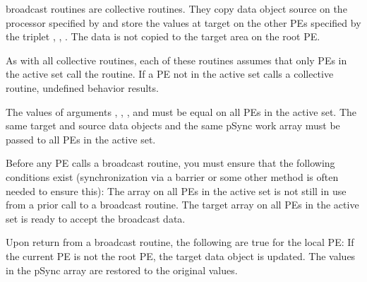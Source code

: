 {   
\openshmem broadcast routines are collective routines.
They copy data object source on the processor specified by  and
store the values at target on the other \ac{PE}s specified by the triplet
, , . The data is not copied to the target
area on the root \ac{PE}.

As with all \openshmem collective routines, each of these routines assumes
that only \ac{PE}s in the active set call the routine. If a \ac{PE} not in the
active set calls a \openshmem collective routine, undefined behavior
results.

The values of arguments , , , and 
must be equal on all \ac{PE}s in the active set. The same target and source
data objects and the same pSync work array must be passed to all \ac{PE}s in
the active set.

Before any \ac{PE} calls a broadcast	routine, you must ensure that the
following conditions exist (synchronization via a barrier or some other
method is often needed to ensure this): The  array on all \ac{PE}s in
the active set is not still in use from a prior call to a broadcast
routine. The target array on all \ac{PE}s in the active set is ready to
accept the broadcast data.

Upon return from a broadcast routine, the following are true for the
local \ac{PE}: If the current \ac{PE} is not the root \ac{PE}, the target data	object
is updated. The values in the pSync array are restored to the original
values.
}
